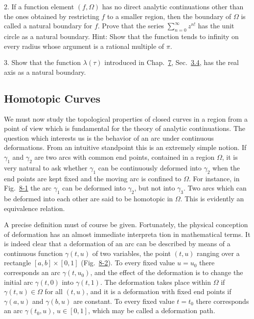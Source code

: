 2. If a function element $(f,\Omega)$ has no direct analytic continuations other than the ones obtained by restricting $f$ to a smaller region, then the boundary of $\Omega$ is called a natural boundary for $f$. Prove that the series $\sum_{n=0}^{\infty}z^{n!}$ has the unit circle as a natural boundary. Hint: Show that the function tends to infinity on every radius whose argument is a rational multiple of $\pi$.

3. Show that the function $\lambda(\tau)$ introduced in Chap.~\hyperref[chap:7]{7}, Sec.~\hyperref[sec:7.3.4]{3.4}, has the real axis as a natural boundary.

\setcounter{section}{1}\setcounter{subsection}{4}\subsection{Homotopic Curves}\label{sec:8.1.5}
We must now study the topological properties of closed curves in a region from a point of view which is fundamental for the theory of analytic continuations. The question which interests us is the behavior of an arc under continuous deformations. From an intuitive standpoint this is an extremely simple notion. If $\gamma_{1}$ and $\gamma_{2}$ are two arcs with common end points, contained in a region $\Omega$, it is very natural to ask whether $\gamma_{1}$ can be continuously deformed into $\gamma_{2}$ when the end points are kept fixed and the moving arc is confined to $\Omega$. For instance, in Fig.~\hyperref[fig:8-1]{8-1} the arc $\gamma_{1}$ can be deformed into $\gamma_{2}$, but not into $\gamma_{3}$. Two arcs which can be deformed into each other are said to be homotopic in $\Omega$. This is evidently an equivalence relation.

A precise definition must of course be given. Fortunately, the physical conception of deformation has an almost immediate interpreta%
%
%
tion in mathematical terms. It is indeed clear that a deformation of an arc can be described by means of a continuous function $\gamma(t,u)$ of two variables, the point $(t,u)$ ranging over a rectangle $[a,b] \times [0,1]$ (Fig.~\hyperref[fig:8-2]{8-2}). To every fixed value $u = u_0$ there corresponds an arc $\gamma(t,u_0)$, and the effect of the deformation is to change the initial arc $\gamma(t,0)$ into $\gamma(t,1)$. The deformation takes place within $\Omega$ if $\gamma(t,u) \in \Omega$ for all $(t,u)$, and it is a deformation with fixed end points if $\gamma(a,u)$ and $\gamma(b,u)$ are constant. To every fixed value $t = t_0$ there corresponds an arc $\gamma(t_0,u)$, $u \in [0,1]$, which may be called a deformation path.


